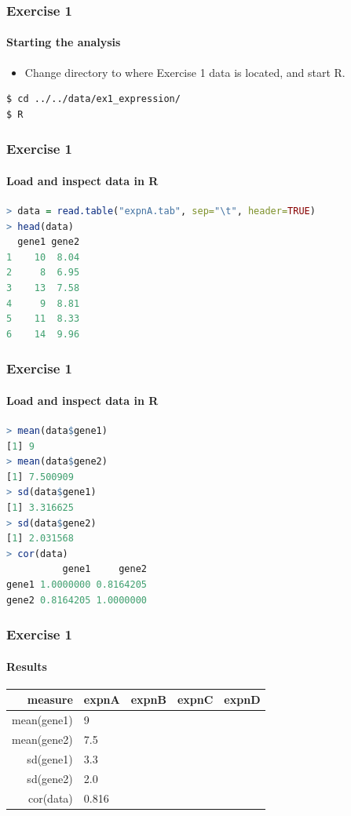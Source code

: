 \begin{frame}[fragile]
  \frametitle{Exercise 1}
  \framesubtitle{Starting the analysis}
  \begin{itemize}
    \item Change directory to where Exercise 1 data is located, and start R.
  \end{itemize}
\begin{lstlisting}[language=bash]
$ cd ../../data/ex1_expression/
$ R
\end{lstlisting}
\end{frame}

\begin{frame}[fragile]
  \frametitle{Exercise 1}
  \framesubtitle{Load and inspect data in R}
\begin{lstlisting}[language=R]
> data = read.table("expnA.tab", sep="\t", header=TRUE)
> head(data)
  gene1 gene2
1    10  8.04
2     8  6.95
3    13  7.58
4     9  8.81
5    11  8.33
6    14  9.96
\end{lstlisting}
\end{frame}

\begin{frame}[fragile]
  \frametitle{Exercise 1}
  \framesubtitle{Load and inspect data in R}
\begin{lstlisting}[language=R]
> mean(data$gene1)
[1] 9
> mean(data$gene2)
[1] 7.500909
> sd(data$gene1)
[1] 3.316625
> sd(data$gene2)
[1] 2.031568
> cor(data)
          gene1     gene2
gene1 1.0000000 0.8164205
gene2 0.8164205 1.0000000
\end{lstlisting}
\end{frame}

\begin{frame}
  \frametitle{Exercise 1}
  \framesubtitle{Results}
  \begin{center}
  \begin{tabular}{r|l|l|l|l}
          measure & expnA & expnB & expnC & expnD \\
	  \hline
	  mean(gene1) & 9     &  &  & \\
	  mean(gene2) & 7.5   &  &  & \\
  	  sd(gene1)   & 3.3   &  &  & \\
  	  sd(gene2)   & 2.0   &  &  & \\  
	  cor(data)   & 0.816 &  &  & \\  
  \end{tabular}
  \end{center}
\end{frame}

